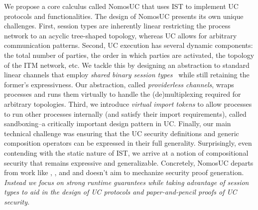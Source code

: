 We propose a core calculus called NomosUC that uses IST to implement UC protocols and functionalities.
The design of NomosUC presents its own unique challenges.
First, session types are inherently linear restricting the process network to an acyclic tree-shaped topology,
whereas UC allows for arbitrary communication patterns.
Second, UC execution has several dynamic components: the total number of parties, the order in which parties are activated,
the topology of the ITM network, etc.
We tackle this by designing an abstraction to standard linear channels that employ \emph{shared binary session types}~\cite{balzer2017manifest} while still retaining the former's expressivness.
Our abstraction, called \emph{providerless channels}, wraps processes and runs them virtually to handle the (de)multiplexing required for arbitrary topologies.
Third, we introduce \emph{virtual import tokens} to allow processes to run other processes internally (and satisfy their import requirements), called sandboxing--a critically important design pattern in UC.
Finally, our main technical challenge was ensuring that the UC security definitions and generic composition operators
can be expressed in their full generality.
Surprisingly, even contending with the static nature of IST, we arrive at a notion of compositional security that remains expressive and generalizable.
Concretely, NomosUC departs from work like \cite{easyuc}, \cite{barbosa}, and \cite{ipdl} and doesn't aim to mechanize security proof generation.
\emph{Instead we focus on strong runtime guarantees while taking advantage of session types to aid in the design of UC protocols and paper-and-pencil proofs of UC security.}


